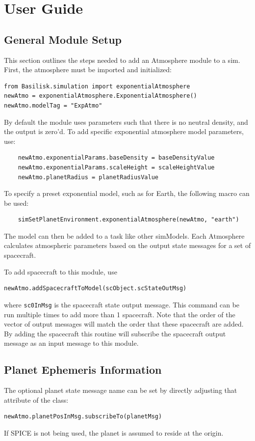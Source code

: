 
\section{User Guide}

\subsection{General Module Setup}
This section outlines the steps needed to add an Atmosphere module to a sim.
First, the atmosphere must be imported and initialized:
\begin{verbatim}
from Basilisk.simulation import exponentialAtmosphere
newAtmo = exponentialAtmosphere.ExponentialAtmosphere()
newAtmo.modelTag = "ExpAtmo"
\end{verbatim}
By default the module uses parameters such that there is no neutral density, and the output is zero'd.  To add specific exponential atmosphere model parameters, use:
\begin{verbatim}
    newAtmo.exponentialParams.baseDensity = baseDensityValue
    newAtmo.exponentialParams.scaleHeight = scaleHeightValue
    newAtmo.planetRadius = planetRadiusValue
\end{verbatim}
To specify a preset exponential model, such as for Earth, the following macro can be used:
\begin{verbatim}
	simSetPlanetEnvironment.exponentialAtmosphere(newAtmo, "earth")
\end{verbatim}

The model can then be added to a task like other simModels. Each Atmosphere calculates atmospheric parameters based on the output state messages for a set of spacecraft.

To add spacecraft to this module, use
\begin{verbatim}
newAtmo.addSpacecraftToModel(scObject.scStateOutMsg)
\end{verbatim}
where {\tt sc0InMsg} is the spacecraft state output message.  This command can be run multiple times to add more than 1 spacecraft.  Note that the order of the vector of output messages will match the order that these spacecraft are added.  By adding the spacecraft this routine will subscribe the spacecraft output message as an input message to this module.

\subsection{Planet Ephemeris Information}
The optional planet state message name can be set by directly adjusting that attribute of the class:
\begin{verbatim}
newAtmo.planetPosInMsg.subscribeTo(planetMsg)
\end{verbatim}
If SPICE is not being used, the planet is assumed to reside at the origin.

